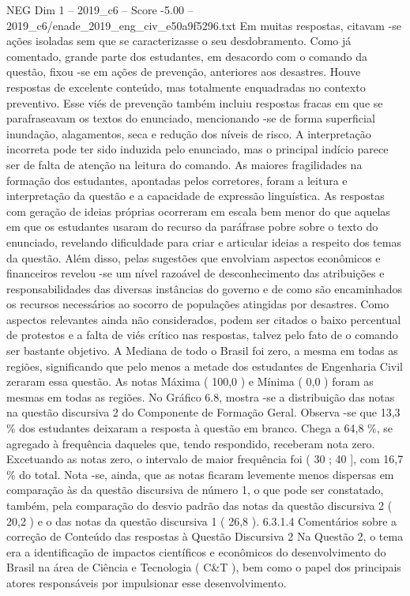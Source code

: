 \begin{textsample}{NEG Dim 1 – 2019\_c6 – Score -5.00 – 2019\_c6/enade\_2019\_eng\_civ\_e50a9f5296.txt}
Em muitas respostas, citavam -se ações isoladas sem que se caracterizasse o seu desdobramento.
Como já comentado, grande parte dos estudantes, em desacordo com o comando da questão, fixou -se em ações de prevenção, anteriores aos desastres.
Houve respostas de excelente conteúdo, mas totalmente enquadradas no contexto preventivo.
Esse viés de prevenção também incluiu respostas fracas em que se parafraseavam os textos do enunciado, mencionando -se de forma superficial inundação, alagamentos, seca e redução dos níveis de risco.
A interpretação incorreta pode ter sido induzida pelo enunciado, mas o principal indício parece ser de falta de atenção na leitura do comando.
As maiores fragilidades na formação dos estudantes, apontadas pelos corretores, foram a leitura e interpretação da questão e a capacidade de expressão linguística.
As respostas com geração de ideias próprias ocorreram em escala bem menor do que aquelas em que os estudantes usaram do recurso da paráfrase pobre sobre o texto do enunciado, revelando dificuldade para criar e articular ideias a respeito dos temas da questão.
Além disso, pelas sugestões que envolviam aspectos econômicos e financeiros revelou -se um nível razoável de desconhecimento das atribuições e responsabilidades das diversas instâncias do governo e de como são encaminhados os recursos necessários ao socorro de populações atingidas por desastres.
Como aspectos relevantes ainda não considerados, podem ser citados o baixo percentual de protestos e a falta de viés crítico nas respostas, talvez pelo fato de o comando ser bastante objetivo.
A Mediana de todo o Brasil foi zero, a mesma em todas as regiões, significando que pelo menos a metade dos estudantes de Engenharia Civil zeraram essa questão.
As notas Máxima ( 100,0 ) e Mínima ( 0,0 ) foram as mesmas em todas as regiões.
No Gráfico 6.8, mostra -se a distribuição das notas na questão discursiva 2 do Componente de Formação Geral.
Observa -se que 13,3 \% dos estudantes deixaram a resposta à questão em branco.
Chega a 64,8 \%, se agregado à frequência daqueles que, tendo respondido, receberam nota zero.
Excetuando as notas zero, o intervalo de maior frequência foi ( 30 ; 40 ], com 16,7 \% do total.
Nota -se, ainda, que as notas ficaram levemente menos dispersas em comparação às da questão discursiva de número 1, o que pode ser constatado, também, pela comparação do desvio padrão das notas da questão discursiva 2 ( 20,2 ) e o das notas da questão discursiva 1 ( 26,8 ). 6.3.1.4 Comentários sobre a correção de Conteúdo das respostas à Questão Discursiva 2 Na Questão 2, o tema era a identificação de impactos científicos e econômicos do desenvolvimento do Brasil na área de Ciência e Tecnologia ( C\&T ), bem como o papel dos principais atores responsáveis por impulsionar esse desenvolvimento.

\end{textsample}
